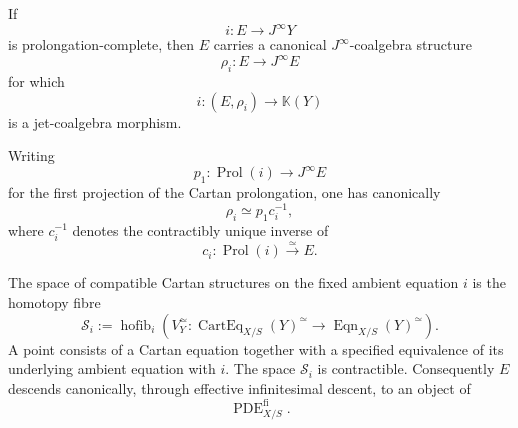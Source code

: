 \begin{theorem}
\label{thm:prolongation-complete-intrinsic-structure}
If
\[
  i:E\to J^\infty Y
\]
is prolongation-complete, then \(E\) carries a canonical
\(J^\infty\)-coalgebra structure
\[
  \rho_i:E\to J^\infty E
\]
for which
\[
  i:(E,\rho_i)\to\mathbb K(Y)
\]
is a jet-coalgebra morphism.

Writing
\[
  p_1:\operatorname{Prol}(i)\to J^\infty E
\]
for the first projection of the Cartan prolongation, one has canonically
\[
  \rho_i
  \simeq
  p_1c_i^{-1},
\]
where \(c_i^{-1}\) denotes the contractibly unique inverse of
\[
  c_i:\operatorname{Prol}(i)\xrightarrow{\simeq}E.
\]

The space of compatible Cartan structures on the fixed ambient equation \(i\)
is the homotopy fibre
\[
  \mathcal S_i
  :=
  \operatorname{hofib}_{i}
  \left(
    V_Y^\simeq:
    \operatorname{CartEq}_{X/S}(Y)^\simeq
    \longrightarrow
    \operatorname{Eqn}_{X/S}(Y)^\simeq
  \right).
\]
A point consists of a Cartan equation together with a specified equivalence
of its underlying ambient equation with \(i\). The space \(\mathcal S_i\) is contractible.
Consequently \(E\) descends canonically, through effective infinitesimal
descent, to an object of
\[
  \operatorname{PDE}^{\mathrm{fi}}_{X/S}.
\]
\end{theorem}

